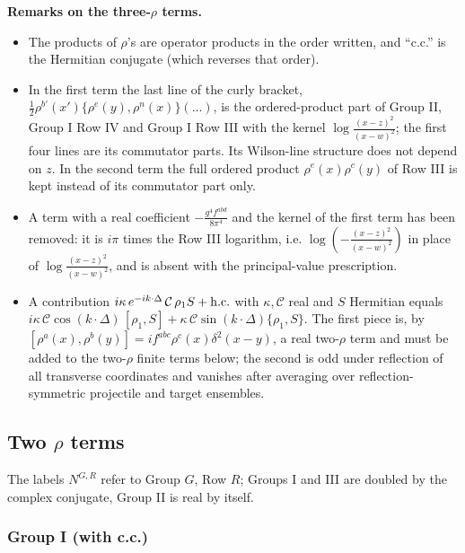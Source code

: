 \documentclass[9pt]{article}
\numberwithin{equation}{section}
\begin{document}
\noindent\textbf{Remarks on the three-$\rho$ terms.}
\begin{itemize}
\item The products of $\rho$'s are operator products in the order written, and ``c.c.'' is the Hermitian conjugate (which reverses that order).
\item In the first term the last line of the curly bracket, $\tfrac12\rho^{b'}(x')\{\rho^{e}(y),\rho^{n}(x)\}(\dots)$, is the ordered-product part of Group II, Group I Row IV and Group I Row III with the kernel $\log\frac{(x-z)^{2}}{(x-w)^{2}}$; the first four lines are its commutator parts. Its Wilson-line structure does not depend on $z$. In the second term the full ordered product $\rho^{e}(x)\rho^{c}(y)$ of Row III is kept instead of its commutator part only.
\item A term with a real coefficient $-\frac{g^{4}f^{abd}}{8\pi^{4}}$ and the kernel of the first term has been removed: it is $i\pi$ times the Row III logarithm, i.e. $\log(-\frac{(x-z)^{2}}{(x-w)^{2}})$ in place of $\log\frac{(x-z)^{2}}{(x-w)^{2}}$, and is absent with the principal-value prescription.
\item A contribution $i\kappa\,e^{-ik\cdot\Delta}\,\mathcal{C}\,\rho_{1}S+{\rm h.c.}$ with $\kappa,\mathcal{C}$ real and $S$ Hermitian equals $i\kappa\,\mathcal{C}\cos(k\cdot\Delta)\,[\rho_{1},S]+\kappa\,\mathcal{C}\sin(k\cdot\Delta)\{\rho_{1},S\}$. The first piece is, by $[\rho^{a}(x),\rho^{b}(y)]=if^{abc}\rho^{c}(x)\delta^{2}(x-y)$, a real two-$\rho$ term and must be added to the two-$\rho$ finite terms below; the second is odd under reflection of all transverse coordinates and vanishes after averaging over reflection-symmetric projectile and target ensembles.
\end{itemize}
\subsection{Two $\rho$ terms}
The labels $N^{G,R}$ refer to Group $G$, Row $R$; Groups I and III are doubled by the complex conjugate, Group II is real by itself.
\subsubsection{Group I (with c.c.)}
\end{document}
